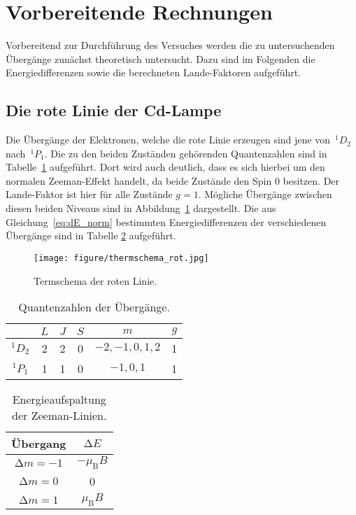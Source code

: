\section{Vorbereitende Rechnungen}
\label{sec:vorbereitung}
%
Vorbereitend zur Durchführung des Versuches werden die zu untersuchenden Übergänge zunächst theoretisch untersucht. Dazu sind im Folgenden die Energiedifferenzen sowie die berechneten Lande-Faktoren aufgeführt.
%
\subsection{Die rote Linie der Cd-Lampe}
%
Die Übergänge der Elektronen, welche die rote Linie erzeugen sind jene von~$^{1}D_2$ nach~$^{1}P_1$. Die zu den beiden Zuständen gehörenden Quantenzahlen sind in Tabelle~\ref{tab:rot_cd} aufgeführt. Dort wird auch deutlich, dass es sich hierbei um den normalen Zeeman-Effekt handelt, da beide Zustände den Spin $0$ besitzen. Der Lande-Faktor ist hier für alle Zustände $g=1$. Mögliche Übergänge zwischen diesen beiden Niveaus sind in Abbildung~\ref{fig:therm_rot} dargestellt. Die aus Gleichung~\eqref{eq:dE_norm} bestimmten Energiedifferenzen der verschiedenen Übergänge sind in Tabelle \ref{tab:rot_cdE} aufgeführt.
%
\begin{figure}
    \centering
    \texttt{[image: figure/thermschema\_rot.jpg]}
    \caption{Termschema der roten Linie.}
    \label{fig:therm_rot}
\end{figure}
%
\begin{table}[H]
    \centering
    \caption{Quantenzahlen der Übergänge.}
    \begin{tabular}{cccccc}
        \toprule
    {} & {$L$}  & {$J$}  & {$S$} & {$m$} & {$g$} \\
		\midrule
	  $^{1}D_2$ & 2 & 2 & 0 & $-2,-1,0,1,2$ & 1 \\
    $^{1}P_1$ & 1 & 1 & 0 & $-1,0,1$ & 1 \\
    \bottomrule
	\end{tabular}
    \label{tab:rot_cd}
\end{table}
%
\begin{table}[H]
    \centering
    \caption{Energieaufspaltung der Zeeman-Linien.}
    \begin{tabular}{cc}
        \toprule
    {Übergang} & {$\mathup{\Delta}E$} \\
		\midrule
	  $\mathup{\Delta}m=-1$ & $-\mu_\mathup{B}B$ \\
    $\mathup{\Delta}m=0$ & 0 \\
    $\mathup{\Delta}m=1$ & $\mu_\mathup{B}B$ \\
    \bottomrule
	\end{tabular}
    \label{tab:rot_cdE}
\end{table}
%
